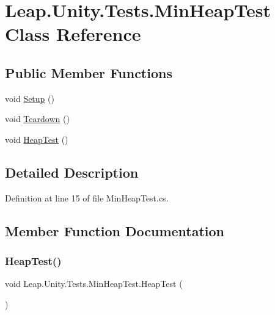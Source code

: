\hypertarget{class_leap_1_1_unity_1_1_tests_1_1_min_heap_test}{}\section{Leap.\+Unity.\+Tests.\+Min\+Heap\+Test Class Reference}
\label{class_leap_1_1_unity_1_1_tests_1_1_min_heap_test}
\subsection*{Public Member Functions}
\begin{DoxyCompactItemize}
\item 
void \mbox{\hyperlink{class_leap_1_1_unity_1_1_tests_1_1_min_heap_test_ab0fdc557c659de1134fbb10b18b884a4}{Setup}} ()
\item 
void \mbox{\hyperlink{class_leap_1_1_unity_1_1_tests_1_1_min_heap_test_a2999b9ca314a777ce8711cfd2104d209}{Teardown}} ()
\item 
void \mbox{\hyperlink{class_leap_1_1_unity_1_1_tests_1_1_min_heap_test_ae5610ac72a1afc8832b8dcc886381000}{Heap\+Test}} ()
\end{DoxyCompactItemize}


\subsection{Detailed Description}


Definition at line 15 of file Min\+Heap\+Test.\+cs.



\subsection{Member Function Documentation}
\mbox{\label{class_leap_1_1_unity_1_1_tests_1_1_min_heap_test_ae5610ac72a1afc8832b8dcc886381000}} 
\subsubsection{\texorpdfstring{HeapTest()}{HeapTest()}}
{\footnotesize\ttfamily void Leap.\+Unity.\+Tests.\+Min\+Heap\+Test.\+Heap\+Test (\begin{DoxyParamCaption}{ }\end{DoxyParamCaption})}



